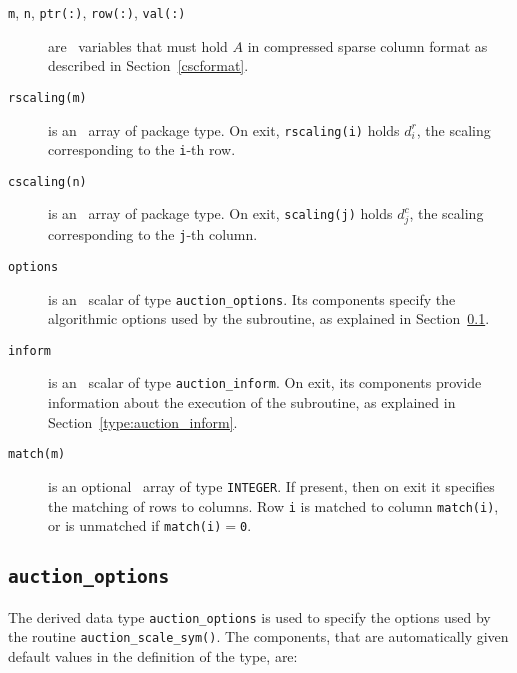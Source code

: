 \begin{description}

\item[\texttt{m}, \texttt{n}, \texttt{ptr(:)}, \texttt{row(:)}, \texttt{val(:)}] are \intentin\ variables that must hold $A$ in compressed sparse column format as described in Section~\ref{cscformat}.

\item[\texttt{rscaling(m)}] is an \intentout\ array of package type. On exit,
\texttt{rscaling(i)} holds $d^r_i$, the scaling corresponding to
the \texttt{i}-th row.

\item[\texttt{cscaling(n)}] is an \intentout\ array of package type. On exit,
\texttt{scaling(j)} holds $d^c_j$, the scaling corresponding to
the \texttt{j}-th column.

\item[\texttt{options}] is an \intentin\ scalar of type \texttt{auction\_options}. Its components specify the algorithmic options used by the subroutine, as explained in Section~\ref{type:auction_options}.

\item[\texttt{inform}] is an \intentout\ scalar of type \texttt{auction\_inform}. On exit, its components provide information about the execution of the subroutine, as explained in Section~\ref{type:auction_inform}.

\item[\texttt{match(m)}] is an optional \intentout\ array of type {\tt INTEGER}.
If present, then on exit it specifies the matching of rows to columns.
Row \texttt{i} is matched to column \texttt{match(i)}, or is unmatched
if \texttt{match(i)}$=$\texttt{0}.

\end{description}

\subsection{\texttt{auction\_options}} \label{type:auction_options}

The derived data type \texttt{auction\_options} is used to specify the options
used by the routine \texttt{auction\_scale\_sym()}. The components, that
are automatically given default values in the definition of the type, are:

